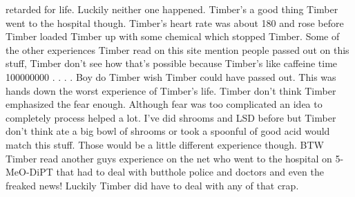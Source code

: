 \documentclass[12pt]{book}
\begin{document}
retarded for life. Luckily neither one happened. Timber's a good thing Timber went to the hospital though. Timber's heart rate was about 180 and rose before Timber loaded Timber up with some chemical which stopped Timber. Some of the other experiences Timber read on this site mention people passed out on this stuff, Timber don't see how that's possible because Timber's like caffeine time 100000000 . . .  . Boy do Timber wish Timber could have passed out. This was hands down the worst experience of Timber's life. Timber don't think Timber emphasized the fear enough. Although fear was too complicated an idea to completely process helped a lot. I've did shrooms and LSD before but Timber don't think ate a big bowl of shrooms or took a spoonful of good acid would match this stuff. Those would be a little different experience though. BTW Timber read another guys experience on the net who went to the hospital on 5-MeO-DiPT that had to deal with butthole police and doctors and even the freaked news! Luckily Timber did have to deal with any of that crap.
\end{document}
